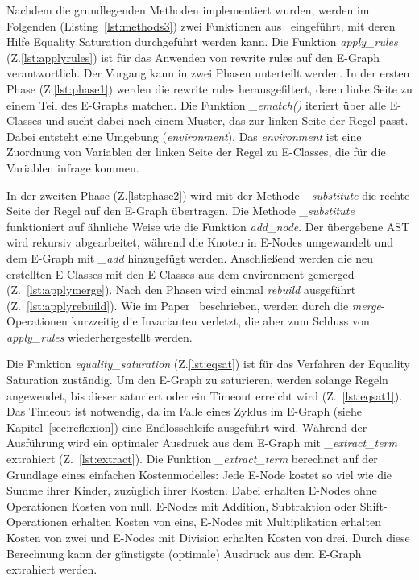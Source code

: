 Nachdem die grundlegenden Methoden implementiert wurden, werden im Folgenden (Listing~\ref{lst:methods3}) zwei Funktionen aus~\cite{devito} eingeführt, mit deren Hilfe Equality Saturation durchgeführt werden kann.
Die Funktion \textit{apply\_rules} (Z.\ref{lst:applyrules}) ist für das Anwenden von rewrite rules auf den E-Graph verantwortlich. Der Vorgang kann in zwei Phasen unterteilt werden.
In der ersten Phase (Z.\ref{lst:phase1}) werden die rewrite rules herausgefiltert, deren linke Seite zu einem Teil des E-Graphs matchen. 
Die Funktion \textit{\_ematch()} iteriert über alle E-Classes und sucht dabei nach einem Muster, das zur linken Seite der Regel passt. Dabei entsteht eine Umgebung (\textit{environment}).
Das \textit{environment} ist eine Zuordnung von Variablen der linken Seite der Regel zu E-Classes, die für die Variablen infrage kommen. 

In der zweiten Phase (Z.\ref{lst:phase2})
wird mit der Methode \textit{\_substitute} die rechte Seite der Regel auf den E-Graph übertragen. Die Methode \textit{\_substitute} funktioniert auf ähnliche Weise wie die Funktion \textit{add\_node}.
Der übergebene AST wird rekursiv abgearbeitet, während die Knoten in E-Nodes umgewandelt und dem E-Graph mit \textit{\_add} hinzugefügt werden. Anschließend werden die neu erstellten E-Classes
mit den E-Classes aus dem environment gemerged (Z.~\ref{lst:applymerge}).
Nach den Phasen wird einmal \textit{rebuild} ausgeführt (Z.~\ref{lst:applyrebuild}). Wie im Paper~\cite{2021-egg} beschrieben, werden durch die \textit{merge}-Operationen kurzzeitig die Invarianten verletzt, 
die aber zum Schluss von \textit{apply\_rules} wiederhergestellt werden.

Die Funktion \textit{equality\_saturation} (Z.\ref{lst:eqsat}) ist für das Verfahren der Equality Saturation zuständig. Um den E-Graph zu saturieren, werden solange Regeln angewendet, bis
dieser saturiert oder ein Timeout erreicht wird (Z.~\ref{lst:eqsat1}).
Das Timeout ist notwendig, da im Falle eines Zyklus im E-Graph (siehe Kapitel~\ref{sec:reflexion}) eine Endlosschleife ausgeführt wird.
Während der Ausführung wird ein optimaler Ausdruck aus dem E-Graph mit \textit{\_extract\_term} extrahiert (Z.~\ref{lst:extract}).
Die Funktion \textit{\_extract\_term} berechnet auf der Grundlage eines einfachen Kostenmodelles: Jede E-Node kostet so viel wie die Summe ihrer Kinder, zuzüglich ihrer Kosten.
Dabei erhalten E-Nodes ohne Operationen Kosten von null. E-Nodes mit Addition, Subtraktion oder Shift-Operationen
erhalten Kosten von eins, E-Nodes mit Multiplikation erhalten Kosten von zwei und E-Nodes mit Division erhalten Kosten von drei.
Durch diese Berechnung kann der günstigste (optimale) Ausdruck aus dem E-Graph extrahiert werden.

